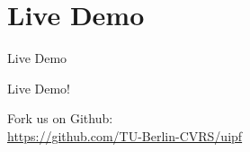 \documentclass{beamer}
\begin{document}

\section{Live Demo}

\begin{frame}{Live Demo}

\begin{center}
	{\Huge
	Live Demo!}
	\vspace{2cm}

	Fork us on Github:\\\vspace{0.2cm}
	\url{https://github.com/TU-Berlin-CVRS/uipf}

\end{center}
\end{frame}
\end{document}

